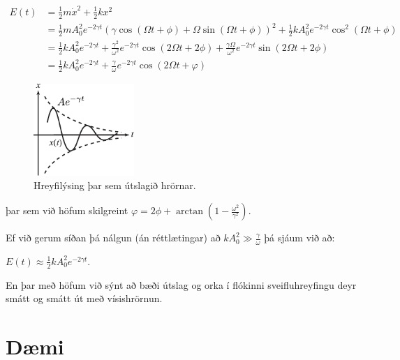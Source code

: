 \ifdefined \wholebook \else\documentclass[oneside]{book}\usepackage{EdlBook}\graphicspath{{figures/}}
\begin{document}
\begin{align*}
    E(t) &= \frac{1}{2}m\dot{x}^2 + \frac{1}{2}kx^2 \\ &= \frac{1}{2}m A_0^2 e^{-2\gamma t}\left( \gamma \cos(\Omega t + \phi) + \Omega \sin(\Omega t + \phi) \right)^2 + \frac{1}{2}kA_0^2 e^{-2\gamma t} \cos^2(\Omega t + \phi) \\
    &= \frac{1}{2}kA_0^2e^{-2\gamma t} + \frac{\gamma^2}{\omega^2}e^{-2\gamma t}\cos(2\Omega t + 2\phi) + \frac{\gamma \Omega}{\omega^2}e^{-2\gamma t}\sin(2\Omega t + 2\phi) \\
    &= \frac{1}{2}kA_0^2 e^{-2\gamma t} + \frac{\gamma}{\omega}e^{-2\gamma t} \cos(2\Omega t + \varphi)
\end{align*}
\begin{minipage}{\linewidth}

\begin{figure}
\vspace{-1cm}
\includegraphics[width = 1.5in]{images/orkan.pdf}
\caption{Hreyfilýsing þar sem útslagið hrörnar.}
\end{figure}
þar sem við höfum skilgreint $\varphi = 2\phi + \arctan(1-\frac{\omega^2}{\gamma^2})$.

Ef við gerum síðan þá nálgun (án réttlætingar) að $kA_0^2 \gg \frac{\gamma}{\omega}$ þá sjáum við að:
\begin{center} \hspace{-1.5cm}
\begin{tcbox}[nobeforeafter]{$ E(t) \approx \frac{1}{2}kA_0^2e^{-2\gamma t}.$}
\end{tcbox}
\end{center}
En þar með höfum við sýnt að bæði útslag og orka í flókinni sveifluhreyfingu deyr smátt og smátt út með vísishrörnun.
\end{minipage}


\newpage

\section{Dæmi}
\end{document}
